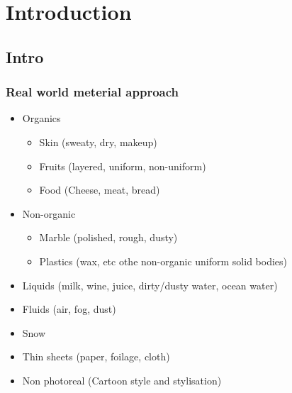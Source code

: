 \chapter{Introduction}
\label{chapter:Introduction}

\section{Intro}
\subsection{Real world meterial approach}
\begin{itemize}
    \item Organics
    \begin{itemize}
      \item Skin (sweaty, dry, makeup)
      \item Fruits (layered, uniform, non-uniform)
      \item Food (Cheese, meat, bread)
    \end{itemize}
    \item Non-organic
    \begin{itemize}
      \item Marble (polished, rough, dusty)
      \item Plastics (wax, etc othe non-organic uniform solid bodies)
    \end{itemize}
    \item Liquids (milk, wine, juice, dirty/dusty water, ocean water)
    \item Fluids (air, fog, dust)
    \item Snow
    \item Thin sheets (paper, foilage, cloth)
    \item Non photoreal (Cartoon style and stylisation)
\end{itemize}

